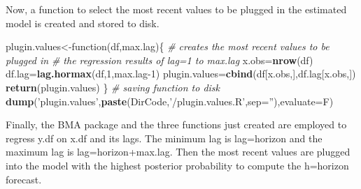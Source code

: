\documentclass[]{article}
\newenvironment{Shaded}{\begin{snugshade}}{\end{snugshade}}
\newcommand{\KeywordTok}[1]{\textcolor[rgb]{0.13,0.29,0.53}{\textbf{{#1}}}}
\newcommand{\DataTypeTok}[1]{\textcolor[rgb]{0.13,0.29,0.53}{{#1}}}
\newcommand{\DecValTok}[1]{\textcolor[rgb]{0.00,0.00,0.81}{{#1}}}
\newcommand{\StringTok}[1]{\textcolor[rgb]{0.31,0.60,0.02}{{#1}}}
\newcommand{\CommentTok}[1]{\textcolor[rgb]{0.56,0.35,0.01}{\textit{{#1}}}}
\newcommand{\NormalTok}[1]{{#1}}
\begin{document}
Now, a function to select the most recent values to be plugged in the
estimated model is created and stored to disk.

\begin{Shaded}
\begin{Highlighting}[]
\NormalTok{plugin.values<-function(df,max.lag)\{}
        \CommentTok{#  creates the most recent values to be plugged in }
        \CommentTok{# the regression results of lag=1 to max.lag}
        \NormalTok{x.obs=}\KeywordTok{nrow}\NormalTok{(df)}
        \NormalTok{df.lag=}\KeywordTok{lag.hormax}\NormalTok{(df,}\DecValTok{1}\NormalTok{,max.lag}\DecValTok{-1}\NormalTok{)}
        \NormalTok{plugin.values=}\KeywordTok{cbind}\NormalTok{(df[x.obs,],df.lag[x.obs,])}
        \KeywordTok{return}\NormalTok{(plugin.values)}
        \NormalTok{\}}
\CommentTok{# saving function to disk}
\KeywordTok{dump}\NormalTok{(}\StringTok{'plugin.values'}\NormalTok{,}\KeywordTok{paste}\NormalTok{(DirCode,}\StringTok{'/plugin.values.R'}\NormalTok{,}\DataTypeTok{sep=}\StringTok{''}\NormalTok{),}\DataTypeTok{evaluate=}\NormalTok{F)}
\end{Highlighting}
\end{Shaded}

Finally, the BMA package and the three functions just created are
employed to regress y.df on x.df and its lags. The minimum lag is
lag=horizon and the maximum lag is lag=horizon+max.lag. Then the most
recent values are plugged into the model with the highest posterior
probability to compute the h=horizon forecast.
\end{document}
